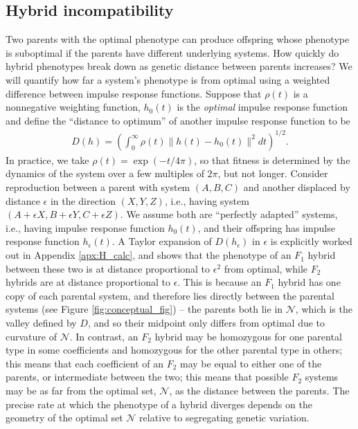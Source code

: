 \documentclass{article}
\newcommand{\1}{\mathbbm{1}}
\newcommand{\allS}{\mathcal{N}}
\begin{document}
\subsection*{Hybrid incompatibility}
Two parents with the optimal phenotype can produce offspring whose phenotype is suboptimal
if the parents have different underlying systems.
How quickly do hybrid phenotypes break down as genetic distance between parents increases?
We will quantify how far a system's phenotype is from optimal
using a weighted difference between impulse response functions.
Suppose that $\rho(t)$ is a nonnegative weighting function, 
$h_0(t)$ is the \emph{optimal} impulse response function
and define the ``distance to optimum'' of another impulse response function
to be
\begin{align}
\label{eqn:distance}
	D(h) = \left( \int_0^\infty \rho(t) \|h(t) - h_0(t)\|^2 dt \right)^{1/2} .
\end{align}
In practice, we take $\rho(t) = \exp(-t/4\pi)$,
so that fitness is determined by the dynamics of the system over a few multiples of $2 \pi$,
but not longer. 
Consider reproduction between a parent with system $(A, B, C)$ 
and another displaced by distance $\epsilon$ in the direction $(X,Y,Z)$,
i.e., having  system $(A + \epsilon X, B + \epsilon Y, C + \epsilon Z)$.
We assume both are ``perfectly adapted'' systems, 
i.e., having impulse response function $h_0(t)$,
and their offspring has impulse response function $h_\epsilon(t)$.
A Taylor expansion of $D(h_\epsilon)$ in $\epsilon$ 
is explicitly worked out in Appendix \ref{apx:H_calc}, and 
shows that the phenotype of an $F_1$ hybrid between these two is at distance proportional to $\epsilon^2$ from optimal,
while $F_2$ hybrids are at distance proportional to $\epsilon$.
This is because an $F_1$ hybrid has one copy of each parental system,
and therefore lies directly between the parental systems (see Figure \ref{fig:conceptual_fig}) --
the parents both lie in $\allS$, which is the valley defined by $D$,
and so their midpoint only differs from optimal due to curvature of $\allS$.
In contrast, an $F_2$ hybrid may be homozygous for one parental type in some coefficients
and homozygous for the other parental type in others;
this means that each coefficient of an $F_2$ may be equal to either one of the parents,
or intermediate between the two;
this means that possible $F_2$ systems may be as far from the optimal set, $\allS$,
as the distance between the parents.
The precise rate at which the phenotype of a hybrid diverges depends on the geometry
of the optimal set $\allS$ relative to segregating genetic variation.
\end{document}
